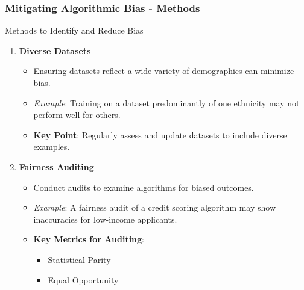 \documentclass{beamer}
\begin{document}
\begin{frame}[fragile]
    \frametitle{Mitigating Algorithmic Bias - Methods}
    \begin{block}{Methods to Identify and Reduce Bias}
        \begin{enumerate}
            \item \textbf{Diverse Datasets}
                \begin{itemize}
                    \item Ensuring datasets reflect a wide variety of demographics can minimize bias.
                    \item \textit{Example}: Training on a dataset predominantly of one ethnicity may not perform well for others.
                    \item \textbf{Key Point}: Regularly assess and update datasets to include diverse examples.
                \end{itemize}
                
            \item \textbf{Fairness Auditing}
                \begin{itemize}
                    \item Conduct audits to examine algorithms for biased outcomes.
                    \item \textit{Example}: A fairness audit of a credit scoring algorithm may show inaccuracies for low-income applicants.
                    \item \textbf{Key Metrics for Auditing}:
                        \begin{itemize}
                            \item Statistical Parity
                            \item Equal Opportunity
                        \end{itemize}
                \end{itemize}
        \end{enumerate}
    \end{block}
\end{frame}
\end{document}
